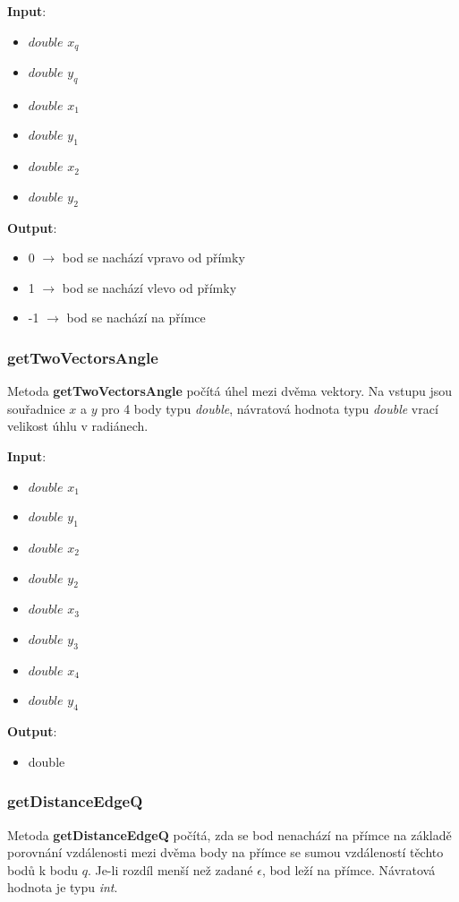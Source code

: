 \documentclass[a4paper, 12pt]{article}
\begin{document}
\textbf{Input}:
\begin{itemize}
\item $double$ $x_q$
\item $double$ $y_q$
\item $double$ $x_1$
\item $double$ $y_1$
\item $double$ $x_2$
\item $double$ $y_2$
\end{itemize}

\textbf{Output}:
\begin{itemize}
\item 0 $\rightarrow$ bod se nachází vpravo od přímky
\item 1 $\rightarrow$ bod se nachází vlevo od přímky
\item -1 $\rightarrow$ bod se nachází na přímce
\end{itemize}

\subsubsection{getTwoVectorsAngle}
Metoda \textbf{getTwoVectorsAngle} počítá úhel mezi dvěma vektory. Na vstupu jsou souřadnice $x$ a $y$ pro 4 body typu \textit{double}, návratová hodnota typu \textit{double} vrací velikost úhlu v radiánech.

\textbf{Input}:
\begin{itemize}
\item $double$ $x_1$
\item $double$ $y_1$
\item $double$ $x_2$
\item $double$ $y_2$
\item $double$ $x_3$
\item $double$ $y_3$
\item $double$ $x_4$
\item $double$ $y_4$
\end{itemize}

\textbf{Output}:
\begin{itemize}
\item double 
\end{itemize}

\subsubsection{getDistanceEdgeQ}
Metoda \textbf{getDistanceEdgeQ} počítá, zda se bod nenachází na přímce na základě porovnání vzdálenosti mezi dvěma body na přímce se sumou vzdáleností těchto bodů k bodu $q$. Je-li rozdíl menší než zadané $\epsilon$, bod leží na přímce. Návratová hodnota je typu \textsl{int}.
\end{document}
